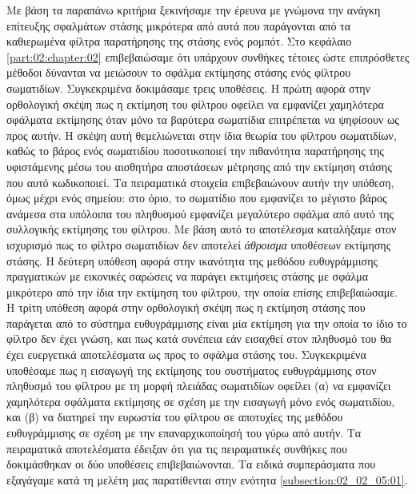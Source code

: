 Με βάση τα παραπάνω κριτήρια ξεκινήσαμε την έρευνα με γνώμονα την ανάγκη
επίτευξης σφαλμάτων στάσης μικρότερα από αυτά που παράγονται από τα καθιερωμένα
φίλτρα παρατήρησης της στάσης ενός ρομπότ. Στο κεφάλαιο
\ref{part:02:chapter:02} επιβεβαιώσαμε ότι υπάρχουν συνθήκες τέτοιες ώστε
επιπρόσθετες μέθοδοι δύνανται να μειώσουν το σφάλμα εκτίμησης στάσης ενός
φίλτρου σωματιδίων. Συγκεκριμένα δοκιμάσαμε τρεις υποθέσεις. Η πρώτη αφορά στην
ορθολογική σκέψη πως η εκτίμηση του φίλτρου οφείλει να εμφανίζει χαμηλότερα
σφάλματα εκτίμησης όταν μόνο τα βαρύτερα σωματίδια επιτρέπεται να ψηφίσουν ως
προς αυτήν. Η σκέψη αυτή θεμελιώνεται στην ίδια θεωρία του φίλτρου σωματιδίων,
καθώς το βάρος ενός σωματιδίου ποσοτικοποιεί την πιθανότητα παρατήρησης της
υφιστάμενης μέσω του αισθητήρα αποστάσεων μέτρησης από την εκτίμηση στάσης που
αυτό κωδικοποιεί. Τα πειραματικά στοιχεία επιβεβαιώνουν αυτήν την υπόθεση, όμως
μέχρι ενός σημείου: στο όριο, το σωματίδιο που εμφανίζει το μέγιστο βάρος
ανάμεσα στα υπόλοιπα του πληθυσμού εμφανίζει μεγαλύτερο σφάλμα από αυτό της
συλλογικής εκτίμησης του φίλτρου. Με βάση αυτό το αποτέλεσμα καταλήξαμε στον
ισχυρισμό πως το φίλτρο σωματιδίων δεν αποτελεί \textit{άθροισμα} υποθέσεων
εκτίμησης στάσης. Η δεύτερη υπόθεση αφορά στην ικανότητα της μεθόδου
ευθυγράμμισης πραγματικών με εικονικές σαρώσεις να παράγει εκτιμήσεις στάσης με
σφάλμα μικρότερο από την ίδια την εκτίμηση του φίλτρου, την οποία επίσης
επιβεβαιώσαμε. Η τρίτη υπόθεση αφορά στην ορθολογική σκέψη πως η εκτίμηση
στάσης που παράγεται από το σύστημα ευθυγράμμισης είναι μία εκτίμηση για την
οποία το ίδιο το φίλτρο δεν έχει γνώση, και πως κατά συνέπεια εάν εισαχθεί στον
πληθυσμό του θα έχει ευεργετικά αποτελέσματα ως προς το σφάλμα στάσης του.
Συγκεκριμένα υποθέσαμε πως η εισαγωγή της εκτίμησης του συστήματος
ευθυγράμμισης στον πληθυσμό του φίλτρου με τη μορφή πλειάδας σωματιδίων οφείλει
(α) να εμφανίζει χαμηλότερα σφάλματα εκτίμησης σε σχέση με την εισαγωγή μόνο
ενός σωματιδίου, και (β) να διατηρεί την ευρωστία του φίλτρου σε αποτυχίες της
μεθόδου ευθυγράμμισης σε σχέση με την επαναρχικοποίησή του γύρω από αυτήν. Τα
πειραματικά αποτελέσματα έδειξαν ότι για τις πειραματικές συνθήκες που
δοκιμάσθηκαν οι δύο υποθέσεις επιβεβαιώνονται. Τα ειδικά συμπεράσματα που
εξαγάγαμε κατά τη μελέτη μας παρατίθενται στην ενότητα
\ref{subsection:02_02_05:01}.


